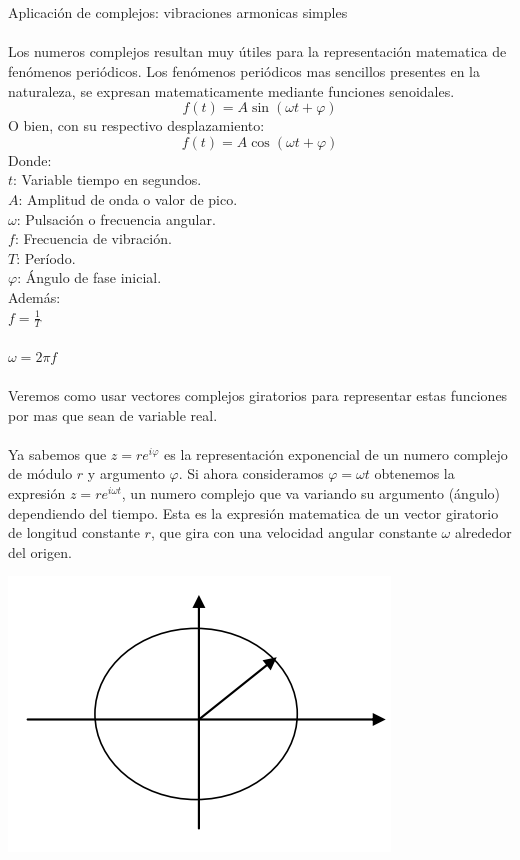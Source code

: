 \documentclass[]{article}
\begin{document}
\\
\\
\huge Aplicación de complejos: vibraciones armonicas simples
\normalsize
\\
\\
Los numeros complejos resultan muy útiles para la representación matematica de fenómenos periódicos. Los fenómenos periódicos mas sencillos presentes en la naturaleza, se expresan matematicamente mediante funciones senoidales.
$$
f(t) = A\sin(\omega t + \varphi)
$$
O bien, con su respectivo desplazamiento:
$$
f(t) = A\cos(\omega t + \varphi)
$$
Donde:\\
$t$: Variable tiempo en segundos.\\
$A$: Amplitud de onda o valor de pico.\\
$\omega$: Pulsación o frecuencia angular.\\
$f$: Frecuencia de vibración.\\
$T$: Período.\\ 
$\varphi$: Ángulo de fase inicial.\\
Además:\\
$f=\frac{1}{T}$\\\\
$\omega = 2\pi f$
\\
\\
Veremos como usar vectores complejos giratorios para representar estas funciones por mas que sean de variable real.
\\
\\
Ya sabemos que $z=re^{i\varphi}$ es la representación exponencial de un numero complejo de módulo $r$ y argumento $\varphi$. Si ahora consideramos $\varphi=\omega t$ obtenemos la expresión $z=re^{i\omega t}$, un numero complejo que va variando su argumento (ángulo) dependiendo del tiempo. Esta es la expresión matematica de un vector giratorio de longitud constante $r$, que gira con una velocidad angular constante $\omega$ alrededor del origen.

\includegraphics{../../../Imagenes/Superior/Complejos/Complejos05.PNG}
\end{document}

